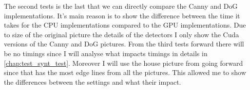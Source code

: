 \begin{table}[H]
\centering
{}
\caption{Timings of the second test for real pictures}
\label{tab:test2c}
\end{table}

The second tests is the last that we can directly compare the \ac{Canny} and \ac{DoG} implementations. It's main reason is to show the difference between the time it takes for the \ac{CPU} implementations compared to the \ac{GPU} implementations. Due to size of the original picture the details of the detectors I only show the Cuda versions of the \ac{Canny} and \ac{DoG} pictures. From the third tests forward there will be no timings since I will analyse what impacts timings in details in \autoref{chap:test_synt_test}. Moreover I will use the house picture from going forward since that has the most edge lines from all the pictures. This allowed me to show the differences between the settings and what their impact.

